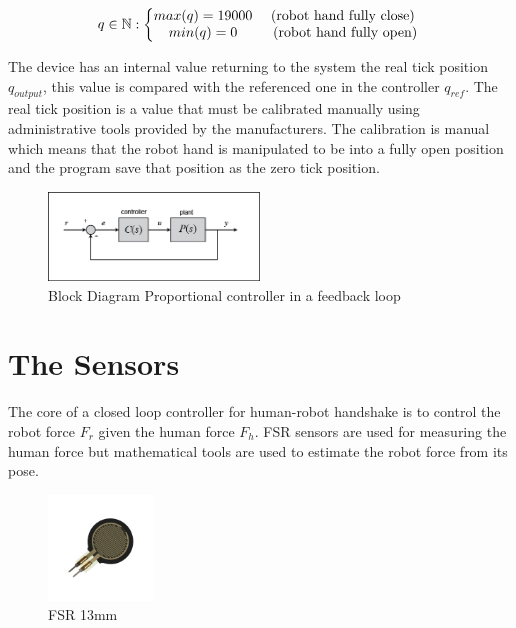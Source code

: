 \begin{equation}
q \in \mathbb{N} : \left\{\begin{matrix}
max(q) = 19000 & $ (robot hand fully close) $ \\ 
min(q) = 0 & $ (robot hand fully open)$
\end{matrix}\right.
\label{eq:qlimits}
\end{equation}

The device has an internal value returning to the system the real tick position $q_{output}$, this value is compared with the referenced one in the controller $q_{ref}$. The real tick position is a value that must be calibrated manually using administrative tools provided by the manufacturers. 
The calibration is manual which means that the robot hand is manipulated to be into a fully open position and the program save that position as the zero tick position.

\begin{figure}[h]
\centering
\includegraphics[width=0.5\textwidth]{Figure/feedbackP.png}
\caption{Block Diagram Proportional controller in a feedback loop}
\label{Fig:Pr}
\end{figure}


\section{The Sensors}
The core of a closed loop controller for human-robot handshake is to control the robot force $F_{r}$ given the human force $F_{h}$. FSR sensors are used for measuring the human force but mathematical tools are used to estimate the robot force from its pose. 

\begin{figure}
\centering
\includegraphics[width=0.25\textwidth]{Figure/fsrsingle1.png}
\caption{FSR 13mm}
\label{Fig:FSRsingle}
\end{figure}

